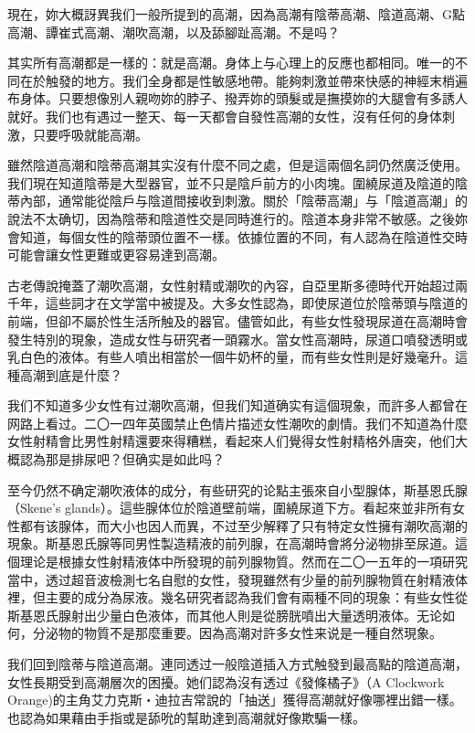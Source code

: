 \documentclass[12pt,UTF8]{ctexbook}
\begin{document}
現在，妳大概訝異我们一般所提到的高潮，因為高潮有陰蒂高潮、陰道高潮、G點高潮、譚崔式高潮、潮吹高潮，以及舔腳趾高潮。不是吗？

其实所有高潮都是一樣的：就是高潮。身体上与心理上的反應也都相同。唯一的不同在於触發的地方。我们全身都是性敏感地帶。能夠刺激並帶來快感的神經末梢遍布身体。只要想像別人親吻妳的脖子、撥弄妳的頭髮或是撫摸妳的大腿會有多誘人就好。我们也有遇过一整天、每一天都會自發性高潮的女性，沒有任何的身体刺激，只要呼吸就能高潮。

雖然陰道高潮和陰蒂高潮其实沒有什麼不同之處，但是這兩個名詞仍然廣泛使用。我们現在知道陰蒂是大型器官，並不只是陰戶前方的小肉塊。圍繞尿道及陰道的陰蒂內部，通常能從陰戶与陰道間接收到刺激。關於「陰蒂高潮」与「陰道高潮」的說法不太确切，因為陰蒂和陰道性交是同時進行的。陰道本身非常不敏感。之後妳會知道，每個女性的陰蒂頭位置不一樣。依據位置的不同，有人認為在陰道性交時可能會讓女性更難或更容易達到高潮。

古老傳說掩蓋了潮吹高潮，女性射精或潮吹的內容，自亞里斯多德時代开始超过兩千年，這些詞才在文学當中被提及。大多女性認為，即使尿道位於陰蒂頭与陰道的前端，但卻不屬於性生活所触及的器官。儘管如此，有些女性發現尿道在高潮時會發生特別的現象，造成女性与研究者一頭霧水。當女性高潮時，尿道口噴發透明或乳白色的液体。有些人噴出相當於一個牛奶杯的量，而有些女性則是好幾毫升。這種高潮到底是什麼？

我们不知道多少女性有过潮吹高潮，但我们知道确实有這個現象，而許多人都曾在网路上看过。二〇一四年英國禁止色情片描述女性潮吹的劇情。我们不知道為什麼女性射精會比男性射精還要來得糟糕，看起來人们覺得女性射精格外唐突，他们大概認為那是排尿吧？但确实是如此吗？

至今仍然不确定潮吹液体的成分，有些研究的论點主張來自小型腺体，斯基恩氏腺（Skene's glands）。這些腺体位於陰道壁前端，圍繞尿道下方。看起來並非所有女性都有该腺体，而大小也因人而異，不过至少解釋了只有特定女性擁有潮吹高潮的現象。斯基恩氏腺等同男性製造精液的前列腺，在高潮時會將分泌物排至尿道。這個理论是根據女性射精液体中所發現的前列腺物質。然而在二〇一五年的一項研究當中，透过超音波檢測七名自慰的女性，發現雖然有少量的前列腺物質在射精液体裡，但主要的成分為尿液。幾名研究者認為我们會有兩種不同的現象：有些女性從斯基恩氏腺射出少量白色液体，而其他人則是從膀胱噴出大量透明液体。无论如何，分泌物的物質不是那麼重要。因為高潮对許多女性来说是一種自然現象。

我们回到陰蒂与陰道高潮。連同透过一般陰道插入方式触發到最高點的陰道高潮，女性長期受到高潮層次的困擾。她们認為沒有透过《發條橘子》（A Clockwork Orange)的主角艾力克斯‧迪拉吉常說的「抽送」獲得高潮就好像哪裡出錯一樣。也認為如果藉由手指或是舔吮的幫助達到高潮就好像欺騙一樣。
\end{document}
